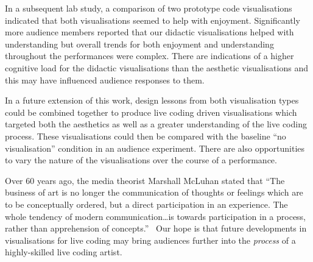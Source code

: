 \documentclass{sig-alternate}
\begin{document}
In a subsequent lab study, a comparison of two prototype code
visualisations indicated that both visualisations seemed to help with
enjoyment. Significantly more audience members reported that our
didactic visualisations helped with understanding but overall trends
for both enjoyment and understanding throughout the performances were
complex. There are indications of a higher cognitive load for the
didactic visualisations than the aesthetic visualisations and this may
have influenced audience responses to them.

In a future extension of this work, design lessons from both
visualisation types could be combined together to produce live coding
driven visualisations which targeted both the aesthetics as well as a
greater understanding of the live coding process. These visualisations
could then be compared with the baseline ``no visualisation''
condition in an audience experiment. There are also opportunities to
vary the nature of the visualisations over the course of a
performance.

Over 60 years ago, the media theorist Marshall McLuhan stated that
``The business of art is no longer the communication of thoughts or
feelings which are to be conceptually ordered, but a direct
participation in an experience. The whole tendency of modern
communication\ldots is towards participation in a process, rather than
apprehension of concepts.''~\cite{McLuhan} Our hope is that future
developments in visualisations for live coding may bring audiences
further into the \emph{process} of a highly-skilled live coding
artist.


\end{document}
